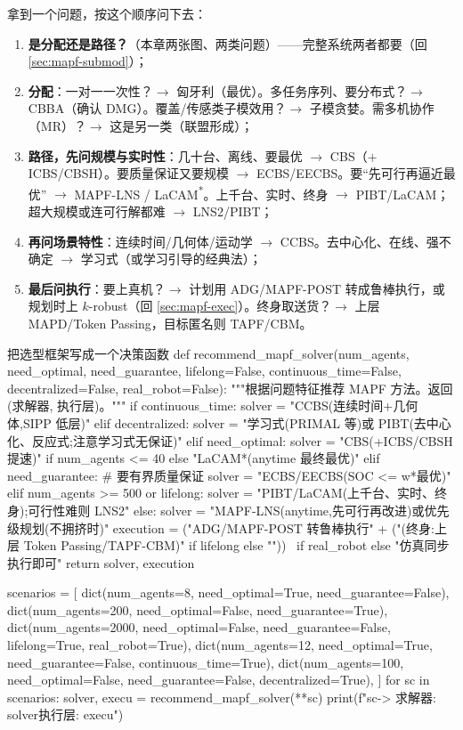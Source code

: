 拿到一个问题，按这个顺序问下去：

\begin{enumerate}
  \item \textbf{是分配还是路径？}（本章两张图、两类问题）——完整系统两者都要（回 \cref{sec:mapf-submod}）；
  \item \textbf{分配}：一对一一次性？$\to$ 匈牙利（最优）。多任务序列、要分布式？$\to$ CBBA（确认 DMG）。覆盖/传感类子模效用？$\to$ 子模贪婪。需多机协作（MR）？$\to$ 这是另一类（联盟形成）；
  \item \textbf{路径，先问规模与实时性}：几十台、离线、要最优 $\to$ CBS（$+$ICBS/CBSH）。要质量保证又要规模 $\to$ ECBS/EECBS。要“先可行再逼近最优” $\to$ MAPF-LNS / LaCAM\textsuperscript{*}。上千台、实时、终身 $\to$ PIBT/LaCAM；超大规模或连可行解都难 $\to$ LNS2/PIBT；
  \item \textbf{再问场景特性}：连续时间/几何体/运动学 $\to$ CCBS。去中心化、在线、强不确定 $\to$ 学习式（或学习引导的经典法）；
  \item \textbf{最后问执行}：要上真机？$\to$ 计划用 ADG/MAPF-POST 转成鲁棒执行，或规划时上 $k$-robust（回 \cref{sec:mapf-exec}）。终身取送货？$\to$ 上层 MAPD/Token Passing，目标匿名则 TAPF/CBM。
\end{enumerate}

\begin{codebox}[Python]{把选型框架写成一个决策函数}
def recommend_mapf_solver(num_agents, need_optimal, need_guarantee,
                          lifelong=False, continuous_time=False,
                          decentralized=False, real_robot=False):
    """根据问题特征推荐 MAPF 方法。返回(求解器, 执行层)。"""
    if continuous_time:
        solver = "CCBS(连续时间+几何体,SIPP 低层)"
    elif decentralized:
        solver = "学习式(PRIMAL 等)或 PIBT(去中心化、反应式;注意学习式无保证)"
    elif need_optimal:
        solver = "CBS(+ICBS/CBSH 提速)" if num_agents <= 40 else "LaCAM*(anytime 最终最优)"
    elif need_guarantee:                                  # 要有界质量保证
        solver = "ECBS/EECBS(SOC <= w*最优)"
    elif num_agents >= 500 or lifelong:
        solver = "PIBT/LaCAM(上千台、实时、终身);可行性难则 LNS2"
    else:
        solver = "MAPF-LNS(anytime,先可行再改进)或优先级规划(不拥挤时)"
    execution = ("ADG/MAPF-POST 转鲁棒执行" + ("(终身:上层 Token Passing/TAPF-CBM)" if lifelong else "")) \
                if real_robot else "仿真同步执行即可"
    return solver, execution

scenarios = [
    dict(num_agents=8,    need_optimal=True,  need_guarantee=False),
    dict(num_agents=200,  need_optimal=False, need_guarantee=True),
    dict(num_agents=2000, need_optimal=False, need_guarantee=False, lifelong=True, real_robot=True),
    dict(num_agents=12,   need_optimal=True,  need_guarantee=False, continuous_time=True),
    dict(num_agents=100,  need_optimal=False, need_guarantee=False, decentralized=True),
]
for sc in scenarios:
    solver, execu = recommend_mapf_solver(**sc)
    print(f"{sc}\n  -> 求解器: {solver}\n     执行层: {execu}\n")
\end{codebox}

